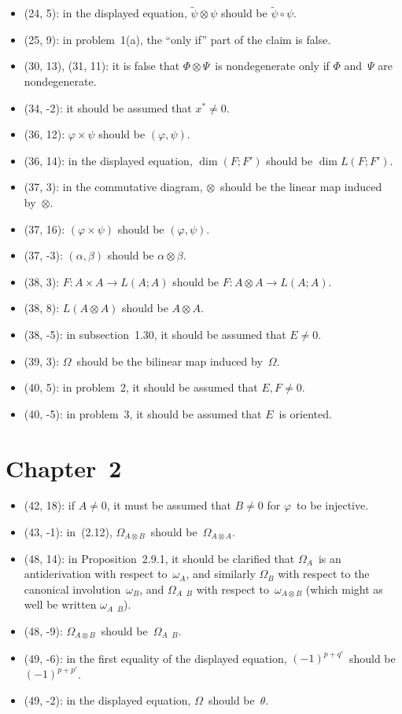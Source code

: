 \documentclass[letterpaper,12pt]{article}
\newcommand{\after}{\circ}
\newcommand{\tprod}{\otimes}
\newcommand{\stprod}{\mathop{\widehat{\otimes}}}
\begin{document}
\begin{itemize}
\item (24, 5): in the displayed equation, \(\widetilde{\psi}\tprod\psi\) should be \(\widetilde{\psi}\after\psi\).
\item (25, 9): in problem~1(a), the ``only if'' part of the claim is false.
\item (30, 13), (31, 11): it is false that \(\Phi\tprod\Psi\)~is nondegenerate only if \(\Phi\) and~\(\Psi\) are nondegenerate.
\item (34, -2): it should be assumed that \(x^*\ne 0\).
\item (36, 12): \(\varphi\times\psi\) should be \((\varphi,\psi)\).
\item (36, 14): in the displayed equation, \(\dim(F;F')\) should be \(\dim L(F;F')\).
\item (37, 3): in the commutative diagram, \(\tprod\)~should be the linear map induced by~\(\tprod\).
\item (37, 16): \((\varphi\times\psi)\) should be \((\varphi,\psi)\).
\item (37, -3): \((\alpha,\beta)\) should be \(\alpha\tprod\beta\).
\item (38, 3): \(F:A\times A\to L(A;A)\) should be \(F:A\tprod A\to L(A;A)\).
\item (38, 8): \(L(A\tprod A)\) should be \(A\tprod A\).
\item (38, -5): in subsection~1.30, it should be assumed that \(E\ne 0\).
\item (39, 3): \(\Omega\)~should be the bilinear map induced by~\(\Omega\).
\item (40, 5): in problem~2, it should be assumed that \(E,F\ne 0\).
\item (40, -5): in problem~3, it should be assumed that \(E\)~is oriented.
\end{itemize}

\section*{Chapter~2}
\begin{itemize}
\item (42, 18): if \(A\ne 0\), it must be assumed that \(B\ne 0\) for \(\varphi\)~to be injective.
\item (43, -1): in~(2.12), \(\Omega_{A\tprod B}\)~should be~\(\Omega_{A\tprod A}\).
\item (48, 14): in Proposition~2.9.1, it should be clarified that \(\Omega_A\)~is an antiderivation with respect to~\(\omega_A\), and similarly \(\Omega_B\) with respect to the canonical involution~\(\omega_B\), and \(\Omega_{A\stprod B}\) with respect to~\(\omega_{A\tprod B}\) (which might as well be written \(\omega_{A\stprod B}\)).
\item (48, -9): \(\Omega_{A\tprod B}\)~should be~\(\Omega_{A\stprod B}\).
\item (49, -6): in the first equality of the displayed equation, \((-1)^{p+q'}\)~should be~\((-1)^{p+p'}\).
\item (49, -2): in the displayed equation, \(\Omega\)~should be~\(\theta\).
\end{itemize}
\end{document}
